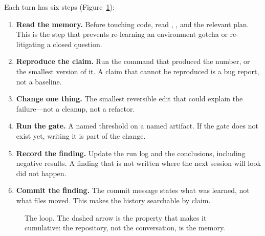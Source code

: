 Each turn has six steps (Figure~\ref{fig:loop}):
\begin{enumerate}
  \item \textbf{Read the memory.} Before touching code, read ,
        ,  and the relevant plan. This is
        the step that prevents re-learning an environment gotcha or
        re-litigating a closed question.
  \item \textbf{Reproduce the claim.} Run the command that produced the number,
        or the smallest version of it. A claim that cannot be reproduced is a
        bug report, not a baseline.
  \item \textbf{Change one thing.} The smallest reversible edit that could
        explain the failure---not a cleanup, not a refactor.
  \item \textbf{Run the gate.} A named threshold on a named artifact. If the
        gate does not exist yet, writing it is part of the change.
  \item \textbf{Record the finding.} Update the run log and the conclusions,
        including negative results. A finding that is not written where the next
        session will look did not happen.
  \item \textbf{Commit the finding.} The commit message states what was learned,
        not what files moved. This makes the history searchable by claim.
\end{enumerate}

\begin{figure}[htbp]
\centering
{}
\caption{The loop. The dashed arrow is the property that makes it cumulative:
the repository, not the conversation, is the memory.}
\label{fig:loop}
\end{figure}

